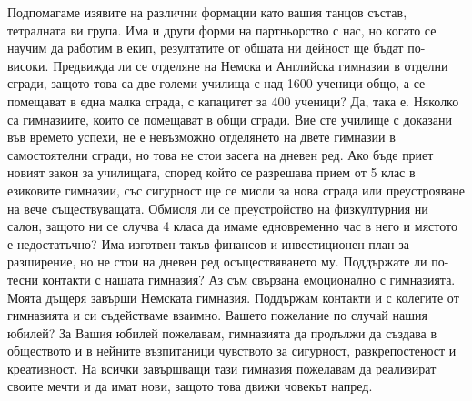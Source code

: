 \begin{multicols}{3}
Подпомагаме изявите на различни формации като вашия танцов състав, тетралната ви 
група. Има и други форми на партньорство с нас, но когато се научим да работим в 
екип, резултатите от общата ни дейност ще бъдат по-високи.
Предвижда ли се отделяне на Немска и Английска гимназии в отделни сгради, защото 
това са две големи училища с над 1600 ученици общо, а се помещават в една малка 
сграда, с капацитет за 400 ученици?  
Да, така е. Няколко са гимназиите, които се помещават в общи сгради. Вие сте 
училище с доказани във времето успехи, не е невъзможно отделянето на двете 
гимназии в самостоятелни сгради, но това не стои засега на дневен ред. Ако бъде 
приет новият закон за училищата, според който се разрешава прием от 5 клас  в 
езиковите гимназии, със сигурност ще се мисли  за нова сграда или преустрояване 
на вече съществуващата.
Обмисля ли се преустройство на физкултурния ни салон, защото ни се случва 4 
класа да имаме едновременно час в него и мястото е недостатъчно?
Има изготвен такъв финансов и инвестиционен план за разширение, но не стои на 
дневен ред осъществяването му. 
Поддържате ли по-тесни контакти с нашата гимназия?
Аз съм свързана емоционално с гимназията. Моята дъщеря завърши Немската 
гимназия. Поддържам контакти и с колегите от гимназията и си съдействаме 
взаимно.
Вашето пожелание по случай нашия юбилей?
За Вашия юбилей пожелавам, гимназията да продължи да създава в обществото и в 
нейните възпитаници чувството за сигурност, разкрепостеност и креативност. На 
всички завършващи тази гимназия пожелавам да реализират своите мечти и да имат 
нови, защото това движи човекът напред.
\closearticle
\end{multicols}
